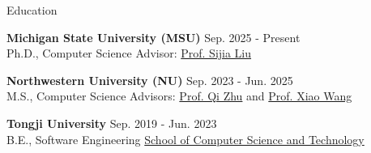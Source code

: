 \begin{rSection}{Education}
\small{{\bf Michigan State University (MSU)} \hfill Sep. 2025 - Present
\\ Ph.D., Computer Science \hfill Advisor: \href{https://lsjxjtu.github.io/index.html}{\textcolor{BS_color}{Prof. Sijia Liu}} 

\vspace{-2mm}
{\bf Northwestern University (NU)} \hfill Sep. 2023 - Jun. 2025
\\ M.S., Computer Science \hfill Advisors:  \href{https://scholar.google.com/citations?user=TN09YMcAAAAJ&hl=en}{\textcolor{BS_color}{Prof. Qi Zhu}} and \href{https://wangxiao1254.github.io/}{\textcolor{BS_color}{Prof. Xiao Wang}}

\vspace{-2mm}
{\bf Tongji University} \hfill Sep. 2019 - Jun. 2023
\\ B.E., Software Engineering \hfill \href{https://cs.tongji.edu.cn/}{\textcolor{BS_color}{School of Computer Science and Technology}}} \\
\vspace{-5.0mm}

\end{rSection}
